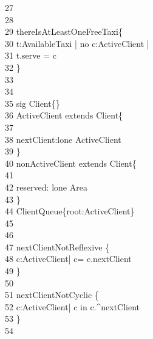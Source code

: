 \-    \ 27	\qquad \\
\-    \ 28	\\
\-    \ 29	 thereIsAtLeastOneFreeTaxi\{\\
\-    \ 30	\qquad \- t:AvailableTaxi | {\color{blue}no} c:ActiveClient |\\
\-    \ 31	\qquad \-\qquad t.serve = c\\
\-    \ 32	\qquad \}\\
\-    \ 33	\qquad \\
\-    \ 34	\\
\-    \ 35	 {\color{blue}sig} Client\{\}\\
\-    \ 36	 ActiveClient {\color{blue}extends} Client\{\\
\-    \ 37	\qquad \-\\
\-    \ 38	\qquad \-\qquad nextClient:lone ActiveClient\\
\-    \ 39	\qquad \}\\
\-    \ 40	 nonActiveClient {\color{blue}extends} Client\{\\
\-    \ 41	\qquad \-\\
\-    \ 42	\qquad \-\qquad reserved: {\color{blue}lone} Area\\
\-    \ 43	\qquad \}\\
\-    \ 44	 ClientQueue\{root:ActiveClient\}\\
\-    \ 45	\qquad \\
\-    \ 46	\\
\-    \ 47	 nextClientNotReflexive \{ \\
\-    \ 48	\qquad \- c:ActiveClient| c= c.nextClient\\
\-    \ 49	\qquad \}\\
\-    \ 50	\\
\-    \ 51	 nextClientNotCyclic \{\\
\-    \ 52	\qquad \- c:ActiveClient| c {\color{blue}in} c.\string^nextClient\\
\-    \ 53	\qquad \} \\
\-    \ 54	\\
